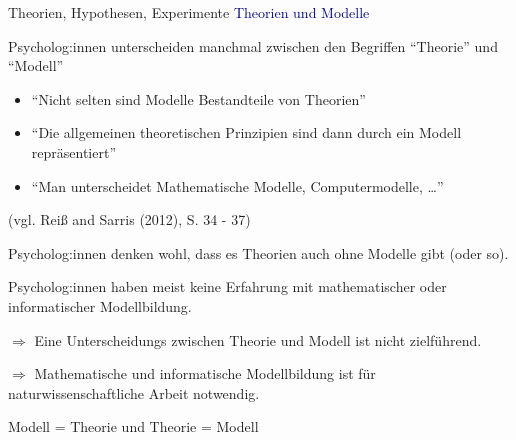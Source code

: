 \documentclass[
  8pt,
  ignorenonframetext,
]{beamer}
\providecommand{\tightlist}{%
  \setlength{\itemsep}{0pt}\setlength{\parskip}{0pt}}
\begin{document}
\begin{frame}{Theorien, Hypothesen, Experimente}
\protect\hypertarget{theorien-hypothesen-experimente-1}{}
\textcolor{darkblue}{Theorien und Modelle} \small {}

Psycholog:innen unterscheiden manchmal zwischen den Begriffen
``Theorie'' und ``Modell''

\begin{itemize}
\tightlist
\item
  ``Nicht selten sind Modelle Bestandteile von Theorien''
\item
  ``Die allgemeinen theoretischen Prinzipien sind dann durch ein Modell
  repräsentiert''
\item
  ``Man unterscheidet Mathematische Modelle, Computermodelle, \ldots{}''
\end{itemize}

\flushright

(vgl. Reiß and Sarris (2012), S. 34 - 37)

\justifying

Psycholog:innen denken wohl, dass es Theorien auch ohne Modelle gibt
(oder so).

Psycholog:innen haben meist keine Erfahrung mit mathematischer oder
informatischer Modellbildung.

\(\Rightarrow\) Eine Unterscheidungs zwischen Theorie und Modell ist
nicht zielführend.

\(\Rightarrow\) Mathematische und informatische Modellbildung ist für
naturwissenschaftliche Arbeit notwendig.

\large
\center

Modell = Theorie und Theorie = Modell
\end{frame}
\end{document}
